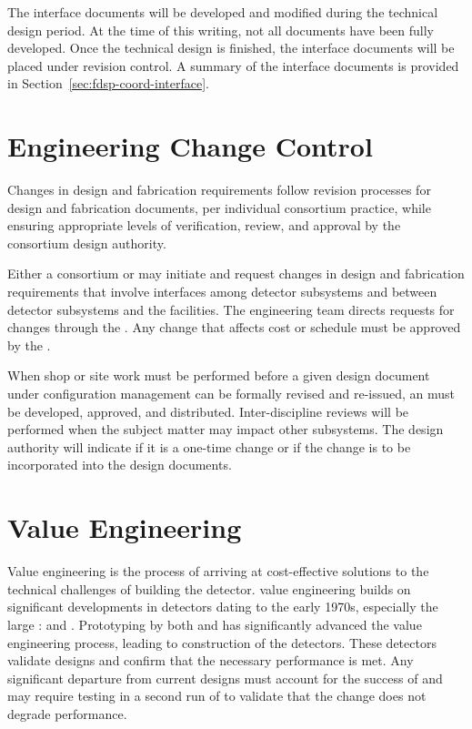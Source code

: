 The interface documents will be developed and modified during the
technical design period. At the time of this writing, not all
documents have been fully developed. Once the technical design is
finished, the interface documents will be placed under revision
control. A summary of the interface documents is provided in
Section~\ref{sec:fdsp-coord-interface}.

\section{Engineering Change Control}
\label{sec:fdsp-change}

Changes in design and fabrication requirements follow revision
processes for design and fabrication documents, per individual
consortium practice, while ensuring appropriate levels of
verification, review, and approval by the consortium design authority.

Either a consortium or  may initiate and request
changes in design and fabrication requirements that involve interfaces among detector subsystems and between detector subsystems and the facilities.  The
 engineering team directs requests for changes through the
. Any change that affects cost or schedule must be approved
by the .

When shop or site work must be performed before a given 
design
document under configuration management can be formally revised and re-issued, 
an  must be developed, approved, and distributed. 
Inter-discipline reviews will be
performed when the  subject matter may impact other
subsystems. The design authority will indicate if it is a one-time
change or if the change is to be incorporated into the design
documents. 



\section{Value Engineering}
\label{sec:fdsp-coord-ve}

Value engineering is the process of arriving at cost-effective
solutions to the technical challenges of building the 
detector.  value engineering builds on significant
developments in  detectors dating to the early 1970s,
especially the large :  and
. Prototyping by both  and  has
significantly advanced the value engineering process, leading to
construction of the  detectors. These detectors validate
 designs and confirm that the necessary performance is
met. Any significant departure from current designs must account for
the success of   and may require testing in a second
run of  to validate that the change does not degrade performance. 

